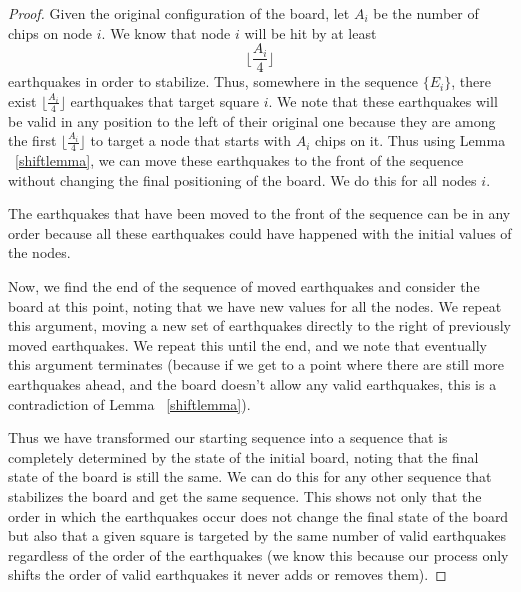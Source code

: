 \documentclass[runningheads,a4paper]{llncs}
\begin{document}
\begin{proof}
Given the original configuration of the board, let $A_i$ be the number of chips on node $i$. We know that node $i$ will be hit by at least 
\begin{equation*}
\lfloor \frac{A_i}{4} \rfloor
\end{equation*}
earthquakes in order to stabilize. Thus, somewhere in the sequence $\{E_i\}$, there exist $\lfloor \frac{A_i}{4} \rfloor$ earthquakes that target  square $i$. We note that these earthquakes will be valid in any position to the left of their original one because they are among the first $\lfloor \frac{A_i}{4} \rfloor$ to target a node that starts with $A_i$ chips on it. Thus using Lemma ~\ref{shiftlemma}, we can move these earthquakes to the front of the sequence without changing the final positioning of the board. We do this for all nodes $i$. 

The earthquakes that have been moved to the front of the sequence can be in any order because all these earthquakes could have happened with the initial values of the nodes. 

Now, we find the end of the sequence of moved earthquakes and consider the board at this point, noting that we have new values for all the nodes. We repeat this argument, moving a new set of earthquakes directly to the right of previously moved earthquakes. We repeat this until the end, and we note that eventually this argument terminates (because if we get to a point where there are still more earthquakes ahead, and the board doesn't allow any valid earthquakes, this is a contradiction of Lemma ~\ref{shiftlemma}).

Thus we have transformed our starting sequence into a sequence that is completely determined by the state of the initial board, noting that the final state of the board is still the same.  We can do this for any other sequence that stabilizes the board and get the same sequence. This shows not only that the order in which the earthquakes occur does not change the final state of the board but also that a given square is targeted by the same number of valid earthquakes regardless of the order of the earthquakes (we know this because our process only shifts the order of valid earthquakes it never adds or removes them). 
\end{proof}
\end{document}

